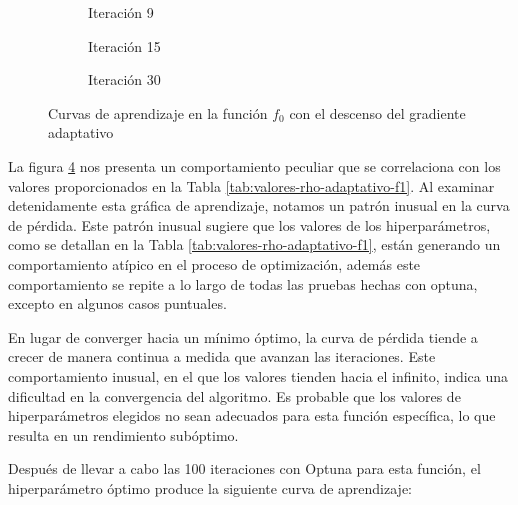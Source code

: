 \begin{figure}[h!]
     \centering
     \begin{subfigure}[b]{0.45\textwidth}
         \centering
         
         \caption{Iteración 9}
         \label{fig:learning-adagrad-f1-9}
     \end{subfigure}
     \hfill
     \begin{subfigure}[b]{0.45\textwidth}
         \centering
         
         \caption{Iteración 15}
         \label{fig:learning-adagrad-f1-15}
     \end{subfigure}
     \hfill
     \begin{subfigure}[b]{0.45\textwidth}
         \centering
         
         \caption{Iteración 30}
         \label{fig:learning-adagrad-f1-30}
     \end{subfigure}
        \caption{Curvas de aprendizaje en la función $f_0$ con el descenso del gradiente adaptativo}
        \label{fig:learning-curves-adagrad-f1}
\end{figure}

La figura \ref{fig:learning-curves-adagrad-f1} nos presenta un comportamiento peculiar que se correlaciona con los valores proporcionados en la Tabla \ref{tab:valores-rho-adaptativo-f1}. Al examinar detenidamente esta gráfica de aprendizaje, notamos un patrón inusual en la curva de pérdida. Este patrón inusual sugiere que los valores de los hiperparámetros, como se detallan en la Tabla \ref{tab:valores-rho-adaptativo-f1}, están generando un comportamiento atípico en el proceso de optimización, además este comportamiento se repite a lo largo de todas las pruebas hechas con optuna, excepto en algunos casos puntuales. 

En lugar de converger hacia un mínimo óptimo, la curva de pérdida tiende a crecer de manera continua a medida que avanzan las iteraciones. Este comportamiento inusual, en el que los valores tienden hacia el infinito, indica una dificultad en la convergencia del algoritmo. Es probable que los valores de hiperparámetros elegidos no sean adecuados para esta función específica, lo que resulta en un rendimiento subóptimo.

Después de llevar a cabo las 100 iteraciones con Optuna para esta función, el hiperparámetro óptimo produce la siguiente curva de aprendizaje:

